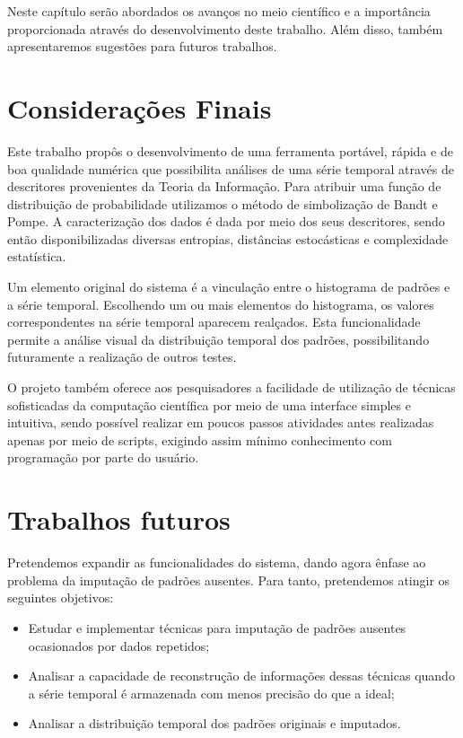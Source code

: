 
Neste capítulo serão abordados os avanços no meio científico e a importância proporcionada através do desenvolvimento deste trabalho. Além disso, também apresentaremos sugestões para futuros trabalhos.

\section{Considerações Finais}

Este trabalho propôs o desenvolvimento de uma ferramenta portável, rápida e de boa qualidade numérica que possibilita análises de uma série temporal através de descritores provenientes da Teoria da Informação. Para atribuir uma função de distribuição de probabilidade utilizamos o método de simbolização de Bandt e Pompe. A caracterização dos dados é dada por meio dos seus descritores, sendo então disponibilizadas diversas entropias, distâncias estocásticas e complexidade estatística.

Um elemento original do sistema é a vinculação entre o histograma de padrões e a série temporal. Escolhendo um ou mais elementos do histograma, os valores correspondentes na série temporal aparecem realçados. Esta funcionalidade permite a análise visual da distribuição temporal dos padrões, possibilitando futuramente a realização de outros testes.

O projeto também oferece aos pesquisadores a facilidade de utilização de técnicas sofisticadas da computação científica por meio de uma interface simples e intuitiva, sendo possível realizar em poucos passos atividades antes realizadas apenas por meio de scripts, exigindo assim mínimo conhecimento com programação por parte do usuário.

\section{Trabalhos futuros}

Pretendemos expandir as funcionalidades do sistema, dando agora ênfase ao problema da imputação de padrões ausentes. Para tanto, pretendemos atingir os seguintes objetivos:

\begin{itemize}
\item Estudar e implementar técnicas para imputação de padrões ausentes ocasionados por dados repetidos;
\item Analisar a capacidade de reconstrução de informações dessas técnicas quando a série temporal é armazenada com menos precisão do que a ideal;
\item Analisar a distribuição temporal dos padrões originais e imputados.
\end{itemize}